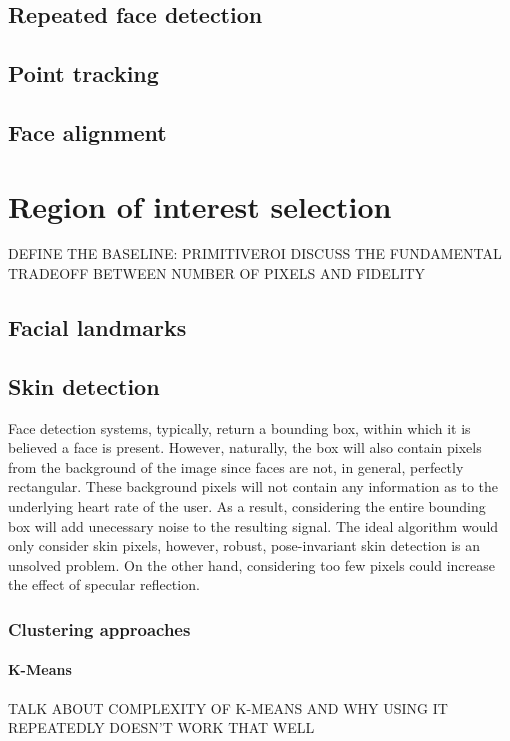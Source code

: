\subsection{Repeated face detection}
\subsection{Point tracking}
\subsection{Face alignment}

\section{Region of interest selection}
DEFINE THE BASELINE: PRIMITIVEROI
DISCUSS THE FUNDAMENTAL TRADEOFF BETWEEN NUMBER OF PIXELS AND FIDELITY
\subsection{Facial landmarks}
\subsection{Skin detection}
Face detection systems, typically, return a bounding box, within which it is believed
a face is present. However, naturally, the box will also contain pixels from the background of 
the image since faces are not, in general, perfectly rectangular.
These background pixels will not contain any information as to the underlying heart rate of the user.
As a result, considering the entire bounding box will add unecessary noise to the resulting signal.
The ideal algorithm would only consider skin pixels, however, robust, pose-invariant skin detection is an unsolved problem.
On the other hand, considering too few pixels could increase the effect of specular reflection.

\subsubsection{Clustering approaches}
\paragraph{K-Means}
TALK ABOUT COMPLEXITY OF K-MEANS AND WHY USING IT REPEATEDLY DOESN'T WORK THAT WELL

